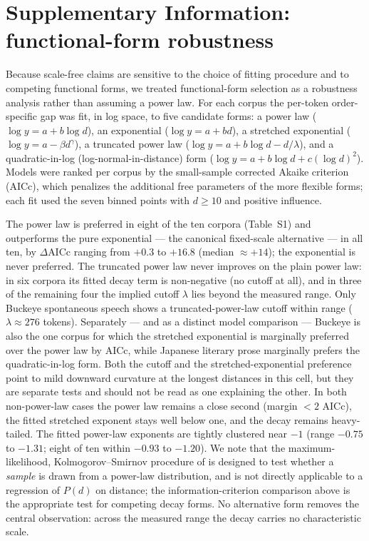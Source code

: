 \documentclass[11pt]{article}
\begin{document}
\section*{Supplementary Information: functional-form robustness}

Because scale-free claims are sensitive to the choice of fitting procedure and to
competing functional forms, we treated functional-form selection as a robustness analysis
rather than assuming a power law. For each corpus the per-token order-specific gap was fit,
in log space, to five candidate forms: a power law ($\log y = a + b\log d$), an exponential
($\log y = a + bd$), a stretched exponential ($\log y = a - \beta d^{\gamma}$), a truncated
power law ($\log y = a + b\log d - d/\lambda$), and a quadratic-in-log (log-normal-in-distance)
form ($\log y = a + b\log d + c(\log d)^2$). Models were ranked per corpus by the small-sample
corrected Akaike criterion (AICc), which penalizes the additional free parameters of the more
flexible forms; each fit used the seven binned points with $d \geq 10$ and positive influence.

The power law is preferred in eight of the ten corpora (Table~S1) and outperforms the pure
exponential --- the canonical fixed-scale alternative --- in all ten, by $\Delta\text{AICc}$
ranging from $+0.3$ to $+16.8$ (median $\approx +14$); the exponential is never preferred. The
truncated power law never improves on the plain power law: in six corpora its fitted decay term
is non-negative (no cutoff at all), and in three of the remaining four the implied cutoff
$\lambda$ lies beyond the measured range. Only Buckeye spontaneous speech shows a truncated-power-law
cutoff within range ($\lambda \approx 276$ tokens). Separately --- and as a distinct model comparison
--- Buckeye is also the one corpus for which the stretched exponential is marginally preferred over the
power law by AICc, while Japanese literary prose marginally prefers the quadratic-in-log form. Both the
cutoff and the stretched-exponential preference point to mild downward curvature at the longest distances
in this cell, but they are separate tests and should not be read as one explaining the other. In both
non-power-law cases the power law remains a close second (margin $<2$ AICc), the fitted stretched
exponent stays well below one, and the decay remains heavy-tailed. The fitted power-law exponents
are tightly clustered near $-1$ (range $-0.75$ to $-1.31$; eight of ten within $-0.93$ to $-1.20$).
We note that the maximum-likelihood, Kolmogorov--Smirnov procedure of \citet{clauset2009power} is
designed to test whether a \emph{sample} is drawn from a power-law distribution, and is not
directly applicable to a regression of $P(d)$ on distance; the information-criterion comparison
above is the appropriate test for competing decay forms. No alternative form removes the central
observation: across the measured range the decay carries no characteristic scale.
\end{document}
